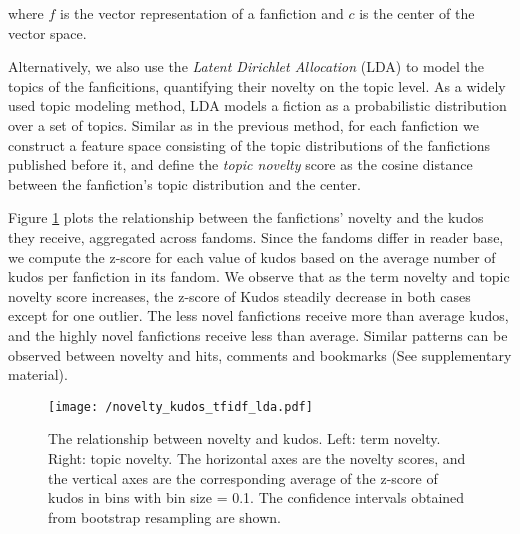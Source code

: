 \documentclass[a4paper]{article}
\begin{document}
where $f$ is the vector representation of a fanfiction and $c$ is the center of the vector space.

Alternatively, we also use the \emph{Latent Dirichlet Allocation} (LDA) \cite{blei2003latent} to model the topics of the fanficitions, quantifying their novelty on the topic level. As a widely used topic modeling method, LDA models a fiction as a probabilistic distribution over a set of topics. Similar as in the previous method, for each fanfiction we construct a feature space consisting of the topic distributions of the fanfictions published before it, and define the \emph{topic novelty} score as the cosine distance between the fanfiction's topic distribution and the center. 

Figure \ref{fig:tfidf_lda_kudos} plots the relationship between the fanfictions' novelty and the kudos they receive, aggregated across fandoms. Since the fandoms differ in reader base, we compute the z-score for each value of kudos based on the average number of kudos per fanfiction in its fandom. We observe that as the term novelty and topic novelty score increases, the z-score of Kudos steadily decrease in both cases except for one outlier. The less novel fanfictions receive more than average kudos, and the highly novel fanfictions receive less than average. Similar patterns can be observed between novelty and hits, comments and bookmarks (See supplementary material).

\begin{figure}
    \centering
          \texttt{[image: /novelty\_kudos\_tfidf\_lda.pdf]}
        \caption{The relationship between novelty and kudos. Left: term novelty. Right: topic novelty. The horizontal axes are the novelty scores, and the vertical axes are the corresponding average of the z-score of kudos in bins with bin size = 0.1. The confidence intervals obtained from bootstrap resampling are shown. }
        \label{fig:tfidf_lda_kudos}
\end{figure}
\end{document}
